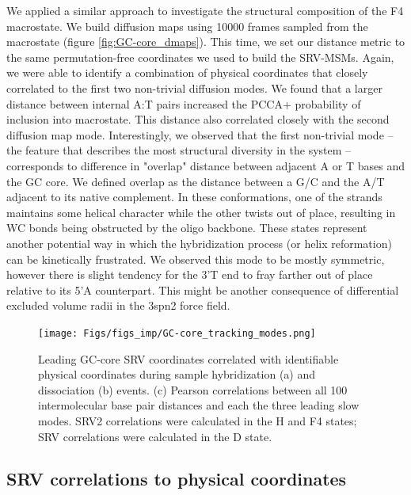 \documentclass[journal=jpcbfk,manuscript=article]{achemso}
\begin{document}
We applied a similar approach to investigate the structural composition of the F4 macrostate. We build diffusion maps using 10000 frames sampled from the macrostate (figure \ref{fig:GC-core_dmaps}). This time, we set our distance metric to the same permutation-free coordinates we used to build the SRV-MSMs. Again, we were able to identify a combination of physical coordinates that closely correlated to the first two non-trivial diffusion modes. We found that a larger distance between internal A:T pairs increased the PCCA+ probability of inclusion into macrostate. This distance also correlated closely with the second diffusion map mode. Interestingly, we observed that the first non-trivial mode -- the feature that describes the most structural diversity in the system -- corresponds to difference in "overlap" distance between adjacent A or T bases and the GC core. We defined overlap as the distance between a G/C and the A/T adjacent to its native complement. In these conformations, one of the strands maintains some helical character while the other twists out of place, resulting in WC bonds being obstructed by the oligo backbone. These states represent another potential way in which the hybridization process (or helix reformation) can be kinetically frustrated. We observed this mode to be mostly symmetric, however there is slight tendency for the 3'T end to fray farther out of place relative to its 5'A counterpart. This might be another consequence of differential excluded volume radii in the 3spn2 force field.

\begin{figure} %
	\begin{center}
        \texttt{[image: Figs/figs\_imp/GC-core\_tracking\_modes.png]}
        \caption{Leading GC-core SRV coordinates correlated with identifiable physical coordinates during sample hybridization (a) and dissociation (b) events. (c) Pearson correlations between all 100 intermolecular base pair distances and each the three leading slow modes. SRV2 correlations were calculated in the H and F4 states; SRV correlations were calculated in the D state.}
        \label{fig:GC-core_tracking_modes}
	\end{center}
\end{figure}    

\subsection{SRV correlations to physical coordinates}
\end{document}
